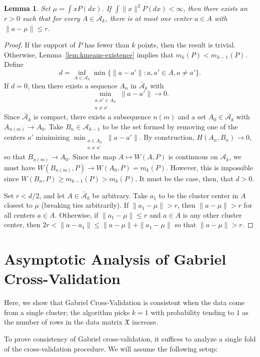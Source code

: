 \documentclass[11pt]{article}
\newtheorem{lemma}{Lemma}
\newcommand{\dataX}{\mathfrak{X}}
\newcommand{\sA}{\mathcal{A}}
\newcommand{\sbA}{\mathcal{\bar A}}
\begin{document}
\begin{lemma}
Set $\mu = \int x P(dx)$.  If $\int \|x\|^2 P(dx) < \infty$, then there exists
an $r > 0$ such that for every $A \in \sbA_k$, there is at most one center $a
\in A$ with $\|a - \mu\| \leq r$.
\end{lemma}
\begin{proof}
If the support of $P$ has fewer than $k$ points, then the result is trivial.
Otherwise, Lemma~\ref{lem:kmeans-existence} implies that $m_k(P) <
m_{k-1}(P)$.  Define
\[
  d =
    \inf_{A \in \sA_k}
      \min \{ \|a - a'\| : a,a' \in A, a \neq a' \}.
\]
If $d = 0$, then there exists a sequence $A_n$ in $\sbA_k$ with
\[
  \min_{\substack{a,a' \in A_n \\ a \neq a'}} \|a - a'\| \to 0.
\]
Since $\sbA_k$ is compact, there exists a subsequence $n(m)$ and a set $A_0
\in \sbA_k$ with $A_{n(m)} \to A_0$.  Take $B_n \in \sA_{k-1}$ to be the set
formed by removing one of the centers $a'$ minimizing $\min_{\substack{a \in
A_n \\ a \neq a'}} \|a - a'\|$.  By construction, $H(A_n, B_n) \to 0$, so that
$B_{n(m)} \to A_0$.  Since the map $A \mapsto W(A, P)$ is continuous on
$\sA_k$, we must have $W(B_{n(m)}, P) \to W(A_0, P) = m_k(P)$.  However, this
is impossible since $W(B_n,P) \geq m_{k-1}(P) > m_k(P)$.  It must be the case,
then, that $d > 0$.


Set $r < d/2$, and let $A \in \sbA_k$ be arbitrary.  Take $a_1$ to be the
cluster center in $A$ closest to $\mu$ (breaking ties arbitrarily).  If $\|a_1
- \mu\| > r$, then $\|a - \mu\| > r$ for all centers $a \in A$.  Otherwise, if
$\|a_1 - \mu\| \leq r$ and $a \in A$ is any other cluster center, then
\(
  2r < \|a - a_1\| \leq \|a - \mu\| + \|a_1 - \mu\|
\)
so that
\(
  \|a - \mu\| > r.
\)
\end{proof}



\section{Asymptotic Analysis of Gabriel Cross-Validation}

Here, we show that Gabriel Cross-Validation is consistent when the data come
from a single cluster; the algorithm picks $k = 1$ with probability tending to
$1$ as the number of rows in the data matrix $\dataX$ increase.


To prove consistency of Gabriel cross-validation, it suffices to analyze a
single fold of the cross-validation procedure.  We will assume the following
setup:
\end{document}
